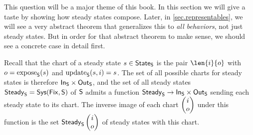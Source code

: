 \documentclass[DynamicalBook]{subfiles}
\begin{document}
This question will be a major theme of this book. In this section we will give a
taste by showing how steady states compose. Later, in \cref{sec.representables}, we will see a very abstract
theorem that generalizes this to \emph{all behaviors}, not just steady states.
But in order for that abstract theorem to make sense, we should see a concrete
case in detail first.  

Recall that the chart of a steady state $s \in \mathsf{State}_{\mathsf{S}}$ is the pair
$\len{i}{o}$ with $o = \mathrm{expose}_{\mathsf{S}}(s)$ and $\mathrm{update}_{\mathsf{S}}(s, i) = s$. The set of all
possible charts for steady states is therefore $\mathsf{In}_{\mathsf{S}} \times \mathsf{Out}_{\mathsf{S}}$, and the
set of all steady states $\mathsf{Steady}_{\mathsf{S}} = \mathsf{Sys}(\mathsf{Fix}, \mathsf{S})$ of $\mathsf{S}$ admits a function
$\mathsf{Steady}_{\mathsf{S}} \to \mathsf{In}_{\mathsf{S}} \times \mathsf{Out}_{\mathsf{S}}$ sending each steady state to
its chart. The inverse image of each chart $\begin{pmatrix}{i} \\ {o} \end{pmatrix}$ under this function is
the set $\mathsf{Steady}_{\mathsf{S}}\begin{pmatrix}{i} \\ {o} \end{pmatrix}$ of steady states with this chart.
\end{document}
